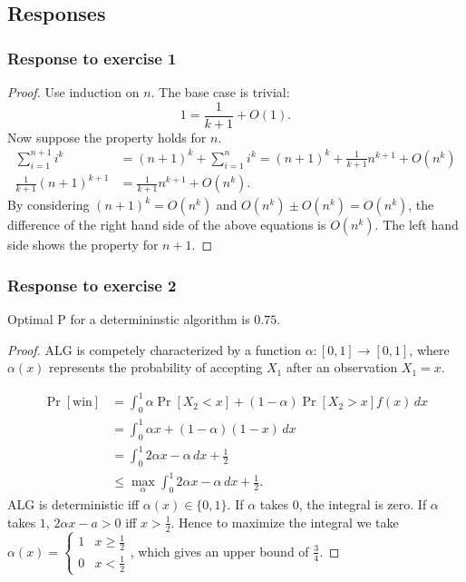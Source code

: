 \subsection{Responses}
\subsubsection{
	Response to exercise 1
}
\begin{proof}
	
Use induction on $n$. The base case is trivial: \[
1 = \frac{1}{k+1}+ O(1)
.\] 
Now suppose the property holds for $n$.
\begin{align*}
	\sum_{i=1}^{n+1} {i^k}&= (n+1)^k + \sum_{i=1}^{n} {i^k} = (n+1)^k + \frac{1}{k+1}n^{k+1} + O(n^k) \\
	\frac{1}{k+1}(n+1)^{k+1} &= \frac{1}{k+1}n^{k+1} + O(n^k)
.\end{align*}
By considering $(n+1)^k = O(n^k)$ and $O(n^k) \pm O(n^k) = O(n^k)$, the difference of the right hand side of the above equations is $O(n^k)$. The left hand side shows the property for $n+1$.
\end{proof}

\subsubsection{
	Response to exercise 2
}
Optimal P for a determininstic algorithm is $0.75$.
\begin{proof}
	$\text{ALG}$ is competely characterized by a function $\alpha: [0,1] \to [ 0,1 ]$, where $\alpha(x)$ represents the probability of accepting  $X_1$ after an observation $X_1 = x$.

\begin{align*}
	\operatorname{Pr}\left[{\text{win}}\right] 
	&= \int_0^1 \alpha \operatorname{Pr}\left[{X_2<x}\right] + (1-\alpha)\operatorname{Pr}\left[{X_2>x}\right] f(x) \, dx \\
	&= \int_0^1 \alpha x + (1-\alpha)(1-x) \,dx\\
	&= \int_0^1 2 \alpha x - \alpha \,dx + \frac{1}{2}\\
	&\le  \max_{\alpha} \int_0^1 2\alpha x - \alpha \,dx + \frac{1}{2}
.\end{align*}
$\text{ALG}$ is deterministic iff $\alpha(x) \in \{0,1\}$. If $\alpha$ takes $0$, the integral is zero. If $\alpha$ takes $1$, $2\alpha x - a > 0$ iff $x > \frac{1}{2}$. Hence to maximize the integral we take $\alpha(x) = \begin{cases}
	1 &x\ge \frac{1}{2}\\
	0 &x<\frac{1}{2}
\end{cases}$, which gives an upper bound of $\frac{3}{4}$.
\end{proof}


